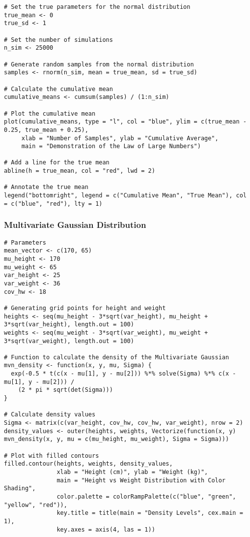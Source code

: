\documentclass{article}
\begin{document}
\begin{lstlisting}
# Set the true parameters for the normal distribution
true_mean <- 0
true_sd <- 1

# Set the number of simulations
n_sim <- 25000

# Generate random samples from the normal distribution
samples <- rnorm(n_sim, mean = true_mean, sd = true_sd)

# Calculate the cumulative mean
cumulative_means <- cumsum(samples) / (1:n_sim)

# Plot the cumulative mean
plot(cumulative_means, type = "l", col = "blue", ylim = c(true_mean - 0.25, true_mean + 0.25),
     xlab = "Number of Samples", ylab = "Cumulative Average",
     main = "Demonstration of the Law of Large Numbers")

# Add a line for the true mean
abline(h = true_mean, col = "red", lwd = 2)

# Annotate the true mean
legend("bottomright", legend = c("Cumulative Mean", "True Mean"), col = c("blue", "red"), lty = 1)
\end{lstlisting}

\subsubsection*{Multivariate Gaussian Distribution}

\begin{lstlisting}
# Parameters
mean_vector <- c(170, 65)
mu_height <- 170
mu_weight <- 65
var_height <- 25
var_weight <- 36
cov_hw <- 18

# Generating grid points for height and weight
heights <- seq(mu_height - 3*sqrt(var_height), mu_height + 3*sqrt(var_height), length.out = 100)
weights <- seq(mu_weight - 3*sqrt(var_weight), mu_weight + 3*sqrt(var_weight), length.out = 100)

# Function to calculate the density of the Multivariate Gaussian
mvn_density <- function(x, y, mu, Sigma) {
  exp(-0.5 * t(c(x - mu[1], y - mu[2])) %*% solve(Sigma) %*% c(x - mu[1], y - mu[2])) /
    (2 * pi * sqrt(det(Sigma)))
}

# Calculate density values
Sigma <- matrix(c(var_height, cov_hw, cov_hw, var_weight), nrow = 2)
density_values <- outer(heights, weights, Vectorize(function(x, y) mvn_density(x, y, mu = c(mu_height, mu_weight), Sigma = Sigma)))

# Plot with filled contours
filled.contour(heights, weights, density_values,
               xlab = "Height (cm)", ylab = "Weight (kg)",
               main = "Height vs Weight Distribution with Color Shading",
               color.palette = colorRampPalette(c("blue", "green", "yellow", "red")),
               key.title = title(main = "Density Levels", cex.main = 1),
               key.axes = axis(4, las = 1))
\end{lstlisting}
\end{document}
